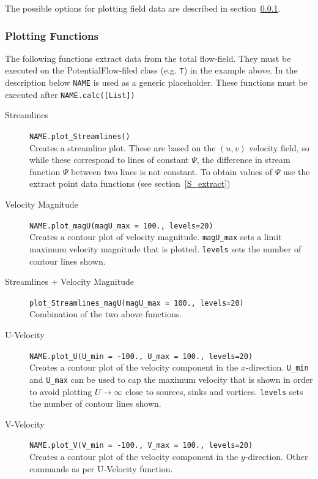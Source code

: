 \documentclass[10pt,a4paper]{article}
\begin{document}
The possible options for plotting field data are described in section~\ref{S_plotting}.

\subsubsection{Plotting Functions}\label{S_plotting}
The following functions extract data from the total flow-field.
They must be executed on the PotentialFlow-filed class (e.g. \verb'T') in the example above.  
In the description below \verb'NAME' is used as a generic placeholder. 
These functions must be executed after \verb'NAME.calc([List])'



\begin{description}
\item[Streamlines] \verb'NAME.plot_Streamlines()'\\
Creates a streamline plot. 
These are based on the $(u,v)$ velocity field, so while these correspond to lines of constant $\Psi$, the difference in stream function $\Psi$ between two lines is not constant. 
To obtain values of $\Psi$ use the extract point data functions (see section~\ref{S_extract})

\item[Velocity Magnitude] \verb'NAME.plot_magU(magU_max = 100., levels=20)'\\
Creates a contour plot of velocity magnitude. \verb'magU_max' sets a limit maximum velocity magnitude that is plotted. \verb'levels' sets the number of contour lines shown.

\item[Streamlines + Velocity Magnitude] \verb'plot_Streamlines_magU(magU_max = 100., levels=20)' \\
Combination of the two above functions.

\item[U-Velocity] \verb'NAME.plot_U(U_min = -100., U_max = 100., levels=20)'\\
Creates a contour plot of the velocity component in the $x$-direction. 
\verb'U_min' and \verb'U_max' can be used to cap the maximum velocity that is shown in order to avoid plotting  $U\rightarrow \infty$ close to sources, sinks and vortices.
\verb'levels' sets the number of contour lines shown.

\item[V-Velocity] \verb'NAME.plot_V(V_min = -100., V_max = 100., levels=20)'\\
Creates a contour plot of the velocity component in the $y$-direction. Other commands as per U-Velocity function.


\end{description}
\end{document}
